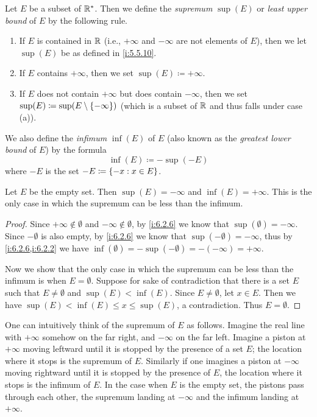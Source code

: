 \begin{defn}\label{i:6.2.6}
  Let \(E\) be a subset of \(\mathbb{R}^*\).
  Then we define the \emph{supremum} \(\sup(E)\) or \emph{least upper bound} of \(E\) by the following rule.
  \begin{enumerate}
    \item If \(E\) is contained in \(\mathbb{R}\) (i.e., \(+\infty\) and \(-\infty\) are not elements of \(E\)), then we let \(\sup(E)\) be as defined in \cref{i:5.5.10}.
    \item If \(E\) contains \(+\infty\), then we set \(\sup(E) \coloneqq +\infty\).
    \item If \(E\) does not contain \(+\infty\) but does contain \(-\infty\), then we set \(\sup(E) \coloneqq \sup(E \setminus \left\lbrace-\infty\right\rbrace)\)
          (which is a subset of \(\mathbb{R}\) and thus falls under case (a)).
  \end{enumerate}
  We also define the \emph{infimum} \(\inf(E)\) of \(E\) (also known as the \emph{greatest lower bound} of \(E\)) by the formula
  \[
    \inf(E) \coloneqq -\sup(-E)
  \]
  where \(-E\) is the set \(-E \coloneqq \left\lbrace-x : x \in E\right\rbrace\).
\end{defn}

\setcounter{thm}{9}
\begin{eg}\label{i:6.2.10}
  Let \(E\) be the empty set.
  Then \(\sup(E) = -\infty\) and \(\inf(E) = +\infty\).
  This is the only case in which the supremum can be less than the infimum.
\end{eg}

\begin{proof}
  Since \(+\infty \notin \emptyset\) and \(-\infty \notin \emptyset\), by \cref{i:6.2.6} we know that \(\sup(\emptyset) = -\infty\).
  Since \(-\emptyset\) is also empty, by \cref{i:6.2.6} we know that \(\sup(-\emptyset) = -\infty\), thus by \cref{i:6.2.6,i:6.2.2} we have \(\inf(\emptyset) = -\sup(-\emptyset) = -(-\infty) = +\infty\).

  Now we show that the only case in which the supremum can be less than the infimum is when \(E = \emptyset\).
  Suppose for sake of contradiction that there is a set \(E\) such that \(E \neq \emptyset\) and \(\sup(E) < \inf(E)\).
  Since \(E \neq \emptyset\), let \(x \in E\).
  Then we have \(\sup(E) < \inf(E) \leq x \leq \sup(E)\), a contradiction.
  Thus \(E = \emptyset\).
\end{proof}

\begin{note}
  One can intuitively think of the supremum of \(E\) as follows.
  Imagine the real line with \(+\infty\) somehow on the far right, and \(-\infty\) on the far left.
  Imagine a piston at \(+\infty\) moving leftward until it is stopped by the presence of a set \(E\);
  the location where it stops is the supremum of \(E\).
  Similarly if one imagines a piston at \(-\infty\) moving rightward until it is stopped by the presence of \(E\), the location where it stops is the infimum of \(E\).
  In the case when \(E\) is the empty set, the pistons pass through each other, the supremum landing at \(-\infty\) and the infimum landing at \(+\infty\).
\end{note}

